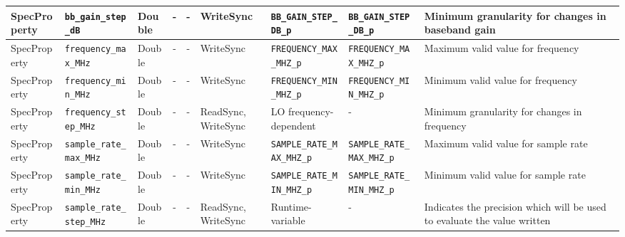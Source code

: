 \documentclass{article}
\begin{document}
\begin{landscape}
\begin{scriptsize}
\begin{longtable}{|p{1.8cm}|p{4.1cm}|p{1cm}|c|c|p{1.6cm}|p{3.7cm}|p{3.7cm}|p{2.5cm}|}
			\hline
			SpecProperty & \verb+bb_gain_step_dB+              & Double& -        & -          & WriteSync      & \verb+BB_GAIN_STEP_DB_p+ & \verb+BB_GAIN_STEP_DB_p+ & Minimum granularity for changes in baseband gain                                                                                                                                                                            \\
			\hline
			SpecProperty & \verb+frequency_max_MHz+            & Double& -        & -          & WriteSync      & \verb+FREQUENCY_MAX_MHZ_p+ & \verb+FREQUENCY_MAX_MHZ_p+ & Maximum valid value for frequency                                                                                                                                                                                           \\
			\hline
			SpecProperty & \verb+frequency_min_MHz+            & Double& -        & -          & WriteSync      & \verb+FREQUENCY_MIN_MHZ_p+ & \verb+FREQUENCY_MIN_MHZ_p+ & Minimum valid value for frequency                                                                                                                                                                                           \\
			\hline
			SpecProperty & \verb+frequency_step_MHz+           & Double& -        & -          & ReadSync, WriteSync & LO frequency-dependent & - & Minimum granularity for changes in frequency                                                                                                                                                                                \\
			\hline
			SpecProperty & \verb+sample_rate_max_MHz+          & Double& -        & -          & WriteSync & \verb+SAMPLE_RATE_MAX_MHZ_p+ & \verb+SAMPLE_RATE_MAX_MHZ_p+ & Maximum valid value for sample rate                                                                                                                                                                                         \\
			\hline
			SpecProperty & \verb+sample_rate_min_MHz+          & Double& -        & -          & WriteSync & \verb+SAMPLE_RATE_MIN_MHZ_p+ & \verb+SAMPLE_RATE_MIN_MHZ_p+ & Minimum valid value for sample rate                                                                                                                                                                                         \\
			\hline
			SpecProperty & \verb+sample_rate_step_MHz+         & Double& -        & -          & ReadSync, WriteSync & Runtime-variable & - & Indicates the precision which will be used to evaluate the value written

\end{longtable}
\end{scriptsize}
\end{landscape}
\end{document}

